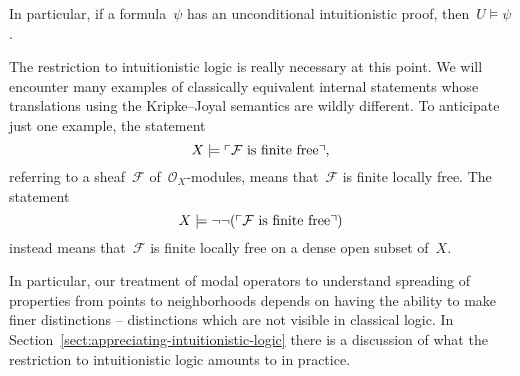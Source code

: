 \documentclass[10pt,reqno,a4paper]{amsbook}
\theoremstyle{definition}
\theoremstyle{plain}
\theoremstyle{remark}
\newcommand{\F}{\mathcal{F}}
\renewcommand{\O}{\mathcal{O}}
\newcommand{\?}{\,{:}\,}
\renewcommand{\_}{\mathpunct{.}\,}
\newcommand{\speak}[1]{\ulcorner\text{\textnormal{#1}}\urcorner}
\newcommand{\XXXh}[1]{}
\begin{document}
In particular, if a formula~$\psi$ has an unconditional intuitionistic proof,
then~$U \models \psi$.

The restriction to intuitionistic logic is really necessary at this point. We
will encounter many examples of classically equivalent internal statements whose
translations using the Kripke--Joyal semantics are wildly different. To
anticipate just one example, the statement
\[ X \models \speak{$\F$ is finite free}, \]
referring to a sheaf~$\F$ of~$\O_X$-modules, means that~$\F$ is finite locally
free. The statement
\[ X \models \neg\neg(\speak{$\F$ is finite free}) \]
instead means that~$\F$ is finite locally free on a dense open subset of~$X$.

In
particular, our treatment of modal operators to understand spreading of
properties from points to neighborhoods depends on having the ability to make
finer distinctions -- distinctions which are not visible in classical logic.
In Section~\ref{sect:appreciating-intuitionistic-logic} there is a discussion of what the restriction to
intuitionistic logic amounts to in practice.

\XXXh{Put rules into an appendix and give some explanation regarding contexts
etc. Don't forget the rules for $\in$, $\bigwedge$, $\bigvee$.}
\end{document}
